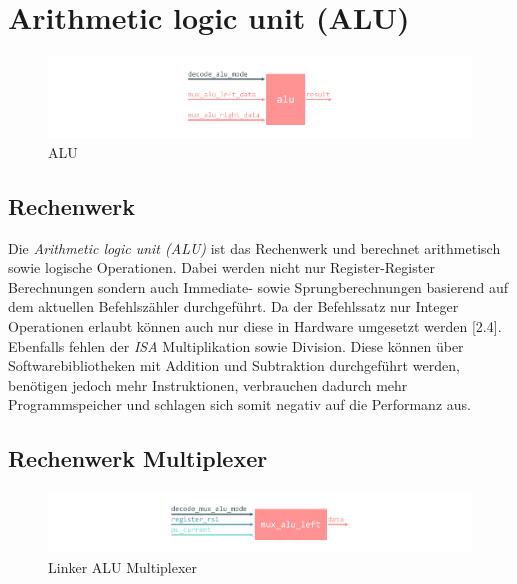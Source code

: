     \section{Arithmetic logic unit (ALU)}

        \begin{figure}[H]
            \centering
            \includegraphics[scale=1]{img/block_alu.pdf}
            \caption{ALU}
            \label{fig:alu}
        \end{figure}

        \subsection{Rechenwerk}
            Die \textit{Arithmetic logic unit (ALU)} ist das Rechenwerk und berechnet arith­me­tisch sowie logische Operationen.
            Dabei werden nicht nur Register-Register Berechnungen sondern auch Immediate- sowie Sprungberechnungen
            basierend auf dem aktuellen Befehlszähler durchgeführt.
            Da der Befehlssatz nur Integer Operationen erlaubt können auch nur diese in Hardware umgesetzt werden \cite{riscv-isa-specs}[2.4].
            Ebenfalls fehlen der \textit{ISA} Multiplikation sowie Division.
            Diese können über Softwarebibliotheken mit Addition und Subtraktion durchgeführt werden,
            benötigen jedoch mehr Instruktionen, verbrauchen dadurch mehr Programmspeicher und schlagen sich somit negativ auf die Performanz aus.

        \subsection{Rechenwerk Multiplexer}

            \begin{figure}[H]
                \centering
                \includegraphics[scale=1]{img/block_mux_alu_left.pdf}
                \caption{Linker ALU Multiplexer}
                \label{fig:alu_mux_left}
            \end{figure}

